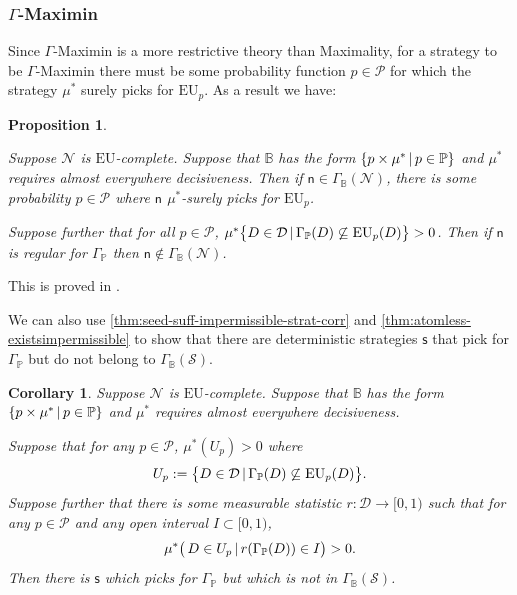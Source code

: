 \documentclass[a4paper,final]{article}
\newtheorem{proposition}[theorem]{Proposition}
\newtheorem{corollary}[theorem]{Corollary}
\renewcommand\P{\mathbb{P}} %
\newcommand\Prob{\mathcal{P}} %
\newcommand\EU{\mathrm{EU}}
\newcommand\Maximin{\Gamma}
\newcommand{\Decs}{\mathcal{D}}
\renewcommand\S{\mathcal{S}}
\newcommand\s{\mathsf{s}}
\newcommand{\n}{\mathsf{n}}
\newcommand\Nu{\mathcal{N}}
\newcommand{\IB}{\mathbb{B}}
\newcommand{\IP}{\P}
\renewcommand{\color}[1]{}
\newenvironment{colored}[1]{\leavevmode\color{#1}}{}
\newcommand\SetDelimiter[1][]{
	\nonscript\,#1\vert \allowbreak \nonscript\,\mathopen{}}
\providecommand\given{\SetDelimiter}
\newenvironment{CCM rewritten}
{\begingroup\color{blue}} %
{\endgroup}              %
\begin{document}
\subsubsection{$\Gamma$-Maximin}


\begin{colored}{blue}

Since $\Gamma$-Maximin is a more restrictive theory than Maximality, for a strategy to be $\Gamma$-Maximin there must be some probability function $p\in\Prob$ %
for which the strategy $\mu^*$ surely picks for
$\EU_p$. As a result we have:

\begin{proposition}\label{thm:gamma-nu}

Suppose $\Nu$ is $\EU$-complete. Suppose that 
		$\IB$ has the form $\{p\times \mu^*\given p\in \IP\}$ and $\mu^*$ requires almost everywhere decisiveness. Then if $\n \in \Maximin_\IB(\Nu)$, there is some probability $p\in\Prob$ where $\n$ $\mu^*$-surely picks for $\EU_p$.
		
		Suppose further that for all $p\in\Prob$, $\mu^*\bigl\{D\in\Decs\given \Gamma_\IP(D)\not \subseteq\EU_{p}(D)\bigr\}>0$. Then if $\n$ is regular for $\Maximin_\IP$ then $\n\notin \Maximin_\IB(\Nu)$.



	\end{proposition}

This is proved in .

We can also use \cref{thm:seed-suff-impermissible-strat-corr} and \cref{thm:atomless-existsimpermissible} to show that there are deterministic strategies $\s$ that pick for $\Gamma_{\IP}$ but do not belong to $\Gamma_\IB(\S)$.




\begin{corollary}\label{thm:gamma-seed-existsimpermissible}
	Suppose $\Nu$ is $\EU$-complete. Suppose that 
	$\IB$ has the form $\{p\times \mu^*\given p\in \IP\}$ and $\mu^*$ requires almost everywhere decisiveness.

Suppose that for any $p\in\Prob$, $\mu^*(U_p)>0$ where 
\[
U_p:=\bigl\{D\in\Decs\given \Gamma_\IP(D)\not \subseteq\EU_p(D)\bigr\}.
\] 
Suppose further that there is some measurable statistic $r:\Decs\rightarrow[0,1)$ such that for any $p\in\Prob$ and any open interval $I\subset[0,1)$, 
\[
\mu^*\bigl(\,D\in U_p\given r(\Gamma_\IP(D))\in I \bigr)>0.
\]
Then there is $\s$ which picks for $\Gamma_\IP$ but which is not in $\Gamma_\IB(\S)$. 
\end{corollary}






\end{colored}
\end{document}
